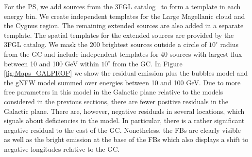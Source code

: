 For the PS, we add sources from the 3FGL catalog~\citep{2015ApJS..218...23A} to form a template
in each energy bin.
We create independent templates for the Large Magellanic cloud and the Cygnus region.
The remaining extended sources are also added in a separate template.
The spatial templates for the extended sources are provided by the 3FGL catalog.
We mask the 200 brightest sources outside a circle of $10^\circ$ radius from the GC and include independent templates
for 40 sources with largest flux between 10 and 100 GeV within $10^\circ$ from the GC.
In Figure \ref{fig:Maps_GALPROP} we show the residual emission plus the \Fermi bubbles model and the gNFW model summed over energies between 10 and 100 GeV.
Due to more free parameters in this model in the Galactic plane relative to the models considered in the previous sections,
there are fewer positive residuals in the Galactic plane.
There are, however, negative residuals in several locations, which signals about deficiencies in the model. 
In particular, there is a rather significant negative residual to the east of the GC.
Nonetheless, the FBs are clearly visible as well as the bright emission at the base of the FBs which also displays a shift to negative
longitudes relative to the GC.


